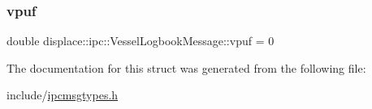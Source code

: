 \subsubsection{\texorpdfstring{vpuf}{vpuf}}
{\footnotesize\ttfamily double displace\+::ipc\+::\+Vessel\+Logbook\+Message\+::vpuf = 0}



The documentation for this struct was generated from the following file\+:\begin{DoxyCompactItemize}
\item 
include/\mbox{\hyperlink{ipcmsgtypes_8h}{ipcmsgtypes.\+h}}\end{DoxyCompactItemize}

